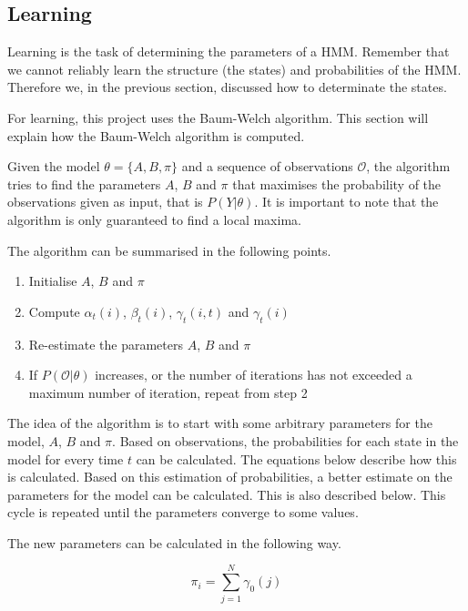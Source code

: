 \subsection{Learning}\label{sec:learner}
Learning is the task of determining the parameters of a HMM. Remember that we cannot reliably learn the structure (the states) and probabilities of the HMM. Therefore we, in the previous section, discussed how to determinate the states.

For learning, this project uses the Baum-Welch algorithm\cite{hmmIntroduction}. This section will explain how the Baum-Welch algorithm is computed.

Given the model $\theta = \{A, B, \pi\}$ and a sequence of observations $\mathcal{O}$, the algorithm tries to find the parameters $A$, $B$ and $\pi$ that maximises the probability of the observations given as input, that is $P(Y | \theta)$. It is important to note that the algorithm is only guaranteed to find a local maxima.

The algorithm can be summarised in the following points\cite{hmmIntroduction}.

\begin{enumerate}
\item Initialise $A$, $B$ and $\pi$
\item Compute $\alpha_t(i)$, $\beta_t(i)$, $\gamma_t(i,t)$ and $\gamma_t(i)$
\item Re-estimate the parameters $A$, $B$ and $\pi$
\item If $P(\mathcal{O} | \theta)$ increases, or the number of iterations has not exceeded a maximum number of iteration, repeat from step 2
\end{enumerate}

The idea of the algorithm is to start with some arbitrary parameters for the model, $A$, $B$ and $\pi$. Based on observations, the probabilities for each state in the model for every time $t$ can be calculated. The equations below describe how this is calculated. Based on this estimation of probabilities, a better estimate on the parameters for the model can be calculated. This is also described below. This cycle is repeated until the parameters converge to some values.

The new parameters can be calculated in the following way\cite{hmmIntroduction}.

\begin{equation*}
\pi_i = \sum\limits_{j=1}^{N} \gamma_0(j)
\end{equation*}

